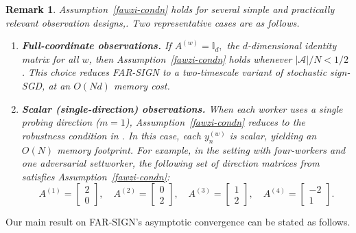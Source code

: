 \documentclass{article}
\newtheorem{theorem}{Theorem}[section]
\newtheorem{remark}[theorem]{Remark}
\newcommand{\farsign}{FAR-SIGN\xspace}
\newcommand{\bI}{\mathbb{I}}
\begin{document}
\begin{remark}
Assumption~\ref{fawzi-condn} holds for several simple and practically relevant observation designs,. Two representative cases are as follows.
%
\begin{enumerate}[leftmargin=*]
    \item \textbf{Full-coordinate observations.}
    If $A^{(w)} = \bI_d,$ the $d$-dimensional identity matrix for all $w$, then Assumption~\ref{fawzi-condn} holds whenever $|\mathcal{A}|/N < 1/2$. This choice reduces \farsign to a two-timescale variant of stochastic sign-SGD, at an $O(Nd)$ memory cost.

    \item \textbf{Scalar (single-direction) observations.}
    When each worker uses a single probing direction ($m=1$), Assumption~\ref{fawzi-condn} reduces to the robustness condition in \citep{fawzi2014secure,ganesh2023online}. In this case, each $y_n^{(w)}$ is scalar, yielding an $O(N)$ memory footprint. For example, in the setting with four-workers and one adversarial settworker, the  following set of direction matrices from \citep{ganesh2023online} satisfies Assumption~\ref{fawzi-condn}:
    \[
        A^{(1)} = \begin{bmatrix} 2 \\ 0 \end{bmatrix},\quad
        A^{(2)} = \begin{bmatrix} 0 \\ 2 \end{bmatrix},\quad
        A^{(3)} = \begin{bmatrix} 1 \\ 2 \end{bmatrix},\quad
        A^{(4)} = \begin{bmatrix} -2 \\ 1 \end{bmatrix}.
    \]
%
\end{enumerate}
\end{remark}


Our main result on \farsign's asymptotic convergence can be stated as follows.

\end{document}
